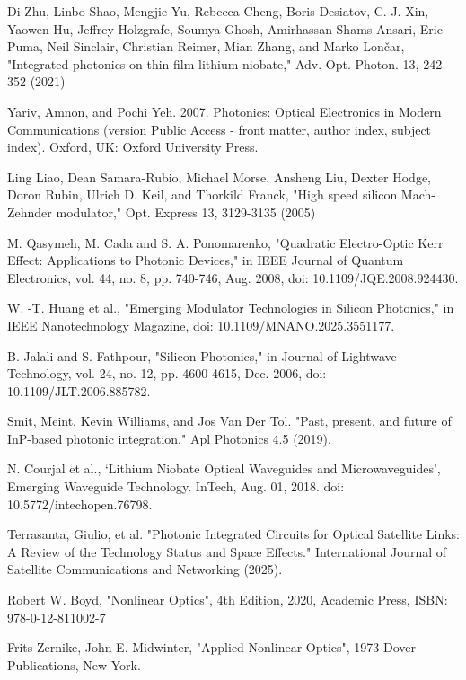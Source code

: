 \documentclass[thesis]{deutez}
\begin{document}
    

\begin{thebibliography}{30}
		 Di Zhu, Linbo Shao, Mengjie Yu, Rebecca Cheng, Boris Desiatov, C. J. Xin, Yaowen Hu, Jeffrey Holzgrafe, Soumya Ghosh, Amirhassan Shams-Ansari, Eric Puma, Neil Sinclair, Christian Reimer, Mian Zhang, and Marko Lončar, "Integrated photonics on thin-film lithium niobate," Adv. Opt. Photon. 13, 242-352 (2021)

         Yariv, Amnon, and Pochi Yeh. 2007. Photonics: Optical Electronics in Modern Communications (version Public Access - front matter, author index, subject index). Oxford, UK: Oxford University Press.

         Ling Liao, Dean Samara-Rubio, Michael Morse, Ansheng Liu, Dexter Hodge, Doron Rubin, Ulrich D. Keil, and Thorkild Franck, "High speed silicon Mach-Zehnder modulator," Opt. Express 13, 3129-3135 (2005)

         M. Qasymeh, M. Cada and S. A. Ponomarenko, "Quadratic Electro-Optic Kerr Effect: Applications to Photonic Devices," in IEEE Journal of Quantum Electronics, vol. 44, no. 8, pp. 740-746, Aug. 2008, doi: 10.1109/JQE.2008.924430.

         W. -T. Huang et al., "Emerging Modulator Technologies in Silicon Photonics," in IEEE Nanotechnology Magazine, doi: 10.1109/MNANO.2025.3551177.

         B. Jalali and S. Fathpour, "Silicon Photonics," in Journal of Lightwave Technology, vol. 24, no. 12, pp. 4600-4615, Dec. 2006, doi: 10.1109/JLT.2006.885782.

         Smit, Meint, Kevin Williams, and Jos Van Der Tol. "Past, present, and future of InP-based photonic integration." Apl Photonics 4.5 (2019).

         N. Courjal et al., ‘Lithium Niobate Optical Waveguides and Microwaveguides’, Emerging Waveguide Technology. InTech, Aug. 01, 2018. doi: 10.5772/intechopen.76798.

         Terrasanta, Giulio, et al. "Photonic Integrated Circuits for Optical Satellite Links: A Review of the Technology Status and Space Effects." International Journal of Satellite Communications and Networking (2025).

         Robert W. Boyd, "Nonlinear Optics", 4th Edition, 2020, Academic Press, ISBN: 978-0-12-811002-7

         Frits Zernike, John E. Midwinter, "Applied Nonlinear Optics", 1973 Dover Publications, New York.


\end{thebibliography}
\end{document}
